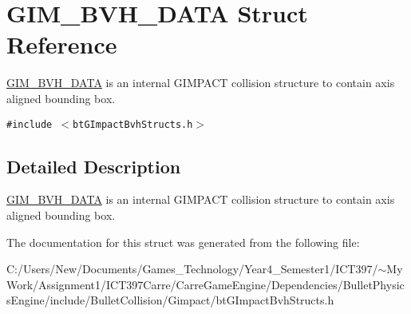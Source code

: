\hypertarget{struct_g_i_m___b_v_h___d_a_t_a}{
\section{GIM\_\-BVH\_\-DATA Struct Reference}
\label{struct_g_i_m___b_v_h___d_a_t_a}
}
\hyperlink{struct_g_i_m___b_v_h___d_a_t_a}{GIM\_\-BVH\_\-DATA} is an internal GIMPACT collision structure to contain axis aligned bounding box.  


{\tt \#include $<$btGImpactBvhStructs.h$>$}



\subsection{Detailed Description}
\hyperlink{struct_g_i_m___b_v_h___d_a_t_a}{GIM\_\-BVH\_\-DATA} is an internal GIMPACT collision structure to contain axis aligned bounding box. 

The documentation for this struct was generated from the following file:\begin{CompactItemize}
\item 
C:/Users/New/Documents/Games\_\-Technology/Year4\_\-Semester1/ICT397/$\sim$My Work/Assignment1/ICT397Carre/CarreGameEngine/Dependencies/BulletPhysicsEngine/include/BulletCollision/Gimpact/btGImpactBvhStructs.h\end{CompactItemize}

